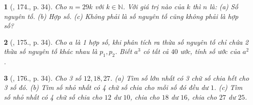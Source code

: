 \documentclass{article}
\newtheorem{baitoan}{}
\begin{document}
\begin{baitoan}[\cite{Tuyen_Toan_6}, 174., p. 34]
	Cho $n = 29k$ với $k\in\mathbb{N}$. Với giá trị nào của $k$ thì $n$ là: (a) Số nguyên tố. (b) Hợp số. (c) Không phải là số nguyên tố cũng không phải là hợp số?
\end{baitoan}

\begin{baitoan}[\cite{Tuyen_Toan_6}, 175., p. 34]
	Cho $a$ là 1 hợp số, khi phân tích ra thừa số nguyên tố chỉ chứa 2 thừa số nguyên tố khác nhau là $p_1,p_2$. Biết $a^3$ có tất cả $40$ ước, tính số ước của $a^2$.
\end{baitoan}

\begin{baitoan}[\cite{Tuyen_Toan_6}, 176., p. 34]
	Cho 3 số $12,18,27$. (a) Tìm số lớn nhất có 3 chữ số chia hết cho 3 số đó. (b) Tìm số nhỏ nhất có 4 chữ số chia cho mỗi số đó đều dư $1$. (c) Tìm số nhỏ nhất có 4 chữ số chia cho $12$ dư $10$, chia cho $18$ dư $16$, chia cho $27$ dư $25$.
\end{baitoan}


\printbibliography[heading=bibintoc]
\end{document}
